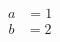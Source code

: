 \documentclass[amsmath
,amssymb]{revtex4}
\begin{document}
\begin{align} a &= 1 \end{align}
\begin{align} b &= 2 \end{align}
\end{document}
